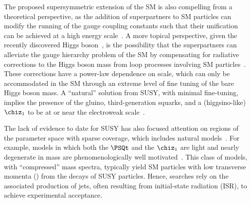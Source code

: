 The proposed supersymmetric extension of the SM is also compelling
from a theoretical perspective, as the addition of superpartners to SM
particles can modify the running of the gauge coupling constants such
that their unification can be achieved at a high energy
scale~\cite{Dimopoulos:1981yj, Ibanez:1981yh, Marciano:1981un}. A
more topical perspective, given the recently discovered Higgs
boson~\cite{ref:atlashiggsdiscovery, ref:cmshiggsdiscovery,
  ref:cmshiggsdiscoverylong}, is the possibility that the
superpartners can alleviate the gauge hierarchy problem of the SM by
compensating for radiative corrections to the Higgs boson mass from
loop processes involving SM particles~\cite{ref:hierarchy1,
  ref:hierarchy2}. These corrections have a power-law dependence on
scale, which can only be accommodated in the SM through an extreme
level of fine tuning of the bare Higgs boson mass. 
A ``natural'' solution from SUSY, with minimal fine-tuning, implies
the presence of the gluino, third-generation squarks, and a
(higgsino-like) $\chiz_1$ to be at or near the electroweak
scale~\cite{ref:barbierinsusy}.

The lack of evidence to date for SUSY has also focused attention on
regions of the parameter space with sparse coverage, which includes
natural models~\cite{Delgado:2012eu, Boehm:1999tr, Carena:2008mj,
  Grober:2014aha, Grober:2015fia}. For example, models in which both
the $\PSQt$ and the $\chiz_1$ are light and nearly degenerate in mass
are phenomenologically well motivated~\cite{Boehm:1999bj,
  Balazs:2004bu, Martin:2007gf, Martin:2007hn}. This class of models,
with ``compressed'' mass spectra, typically yield SM particles with
low transverse momenta (\Pt) from the decays of SUSY particles. Hence,
searches rely on the associated production of jets, often resulting
from initial-state radiation (ISR), to achieve experimental
acceptance.


